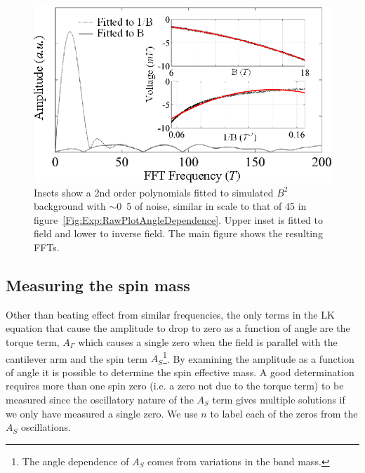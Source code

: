 \begin{figure}[h!]
    \begin{center}
        \includegraphics[scale=1.1]{Chapter-ExperimentalTechnique/Figures/ComparisonBackgroundSubtraction/ComparisonBackgroundSubtraction}
        \caption{Insets show a 2nd order polynomials fitted to simulated $B^2$ background with $\sim$\unit{0.5}{\milli\volt} of noise, similar in scale to that of \unit{45}{\degree} in figure~\ref{Fig:Exp:RawPlotAngleDependence}. Upper inset is fitted to field and lower to inverse field. The main figure shows the resulting \acp{FFT}.}
        \label{Fig:Exp:BackgroundSubtraction}
    \end{center}
\end{figure}

\subsection{Measuring the spin mass}
\label{Sec:Exp:MeasuringSpinMass}

Other than beating effect from similar frequencies, the only terms in the \ac{LK} equation that cause the amplitude to drop to zero as a function of angle are the torque term, $A_\Gamma$ which causes a single zero when the field is parallel with the cantilever arm and the spin term $A_S$\footnote{The angle dependence of $A_S$ comes from variations in the band mass.}. By examining the amplitude as a function of angle it is possible to determine the spin effective mass. A good determination requires more than one spin zero (i.e. a zero not due to the torque term) to be measured since the oscillatory nature of the $A_S$ term gives multiple solutions if we only have measured a single zero. We use $n$ to label each of the zeros from the $A_S$ oscillations.

